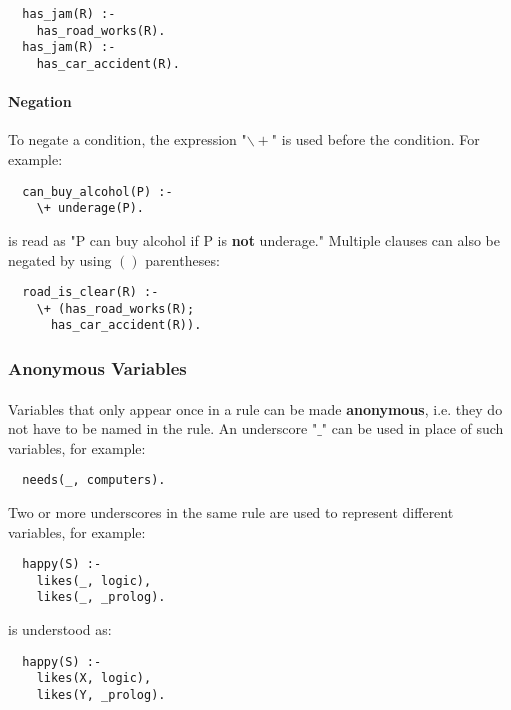 \documentclass{article}
\begin{document}
\begin{multicols}{2}
  \begin{lstlisting}
  has_jam(R) :-
    has_road_works(R).
  has_jam(R) :-
    has_car_accident(R).
  \end{lstlisting}
  
  \paragraph{Negation} To negate a condition, the expression "$\backslash+$" is used before the condition. For example:
  
  \begin{lstlisting}
  can_buy_alcohol(P) :-
    \+ underage(P).
  \end{lstlisting}
  
  \noindent is read as "P can buy alcohol if P is {\bf not} underage." Multiple clauses can also be negated by using $()$ parentheses: 
  
  \begin{lstlisting}
  road_is_clear(R) :-
    \+ (has_road_works(R);
      has_car_accident(R)).
  \end{lstlisting}
  
  \subsubsection{Anonymous Variables} 
  
  \paragraph{} Variables that only appear once in a rule can be made {\bf anonymous}, i.e. they do not have to be named in the rule. An underscore "$\_$" can be used in place of such variables, for example:
  
  \begin{lstlisting}
  needs(_, computers).
  \end{lstlisting}
  
  Two or more underscores in the same rule are used to represent different variables, for example:
  
  \begin{lstlisting}
  happy(S) :-
    likes(_, logic),
    likes(_, _prolog).
  \end{lstlisting}
  
  \noindent is understood as:
  
  \begin{lstlisting}
  happy(S) :-
    likes(X, logic),
    likes(Y, _prolog).
  \end{lstlisting}
  

\end{multicols}
\end{document}
